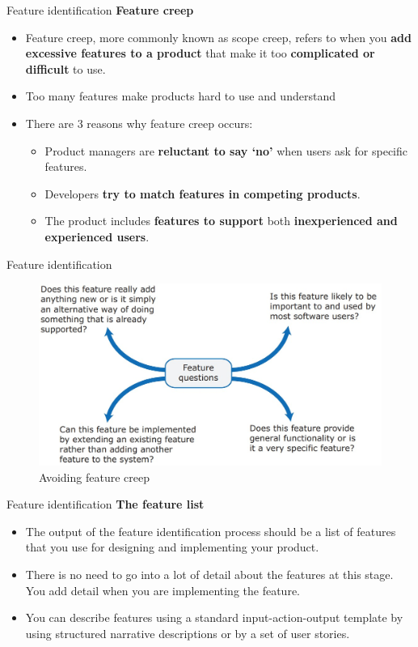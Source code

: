 \documentclass{beamer}
\begin{document}
\begin{frame}{Feature identification}
	\textbf{Feature creep}
	\begin{itemize}
		\item Feature creep, more commonly known as scope creep, refers to when you \textbf{add excessive features to a product} that make it too \textbf{complicated or difficult} to use. 
		\item Too many features make products hard to use and understand
		\item There are 3 reasons why feature creep occurs:
		\begin{itemize}
			\item Product managers are \textbf{reluctant to say ‘no’} when users ask for specific features.
			\item Developers\textbf{ try to match features in competing products}.
			\item The product includes \textbf{features to support} both \textbf{inexperienced and experienced users}.
			
		\end{itemize}
	\end{itemize}
\end{frame}
\begin{frame}{Feature identification}
	\begin{figure}
		\includegraphics[scale=.45]{img/m2_31.jpg}
		\caption{Avoiding feature creep}
	\end{figure}
\end{frame}
\begin{frame}{Feature identification}
		\textbf{The feature list}
		\begin{itemize}
			\item The output of the feature identification process should be a list of features that you use for designing and implementing your product. 
			\item There is no need to go into a lot of detail about the features at this stage. You add detail when you are implementing the feature. 
			\item You can describe features using a standard input-action-output template by using structured narrative descriptions or by a set of user stories.
		\end{itemize}
\end{frame}
\end{document}
